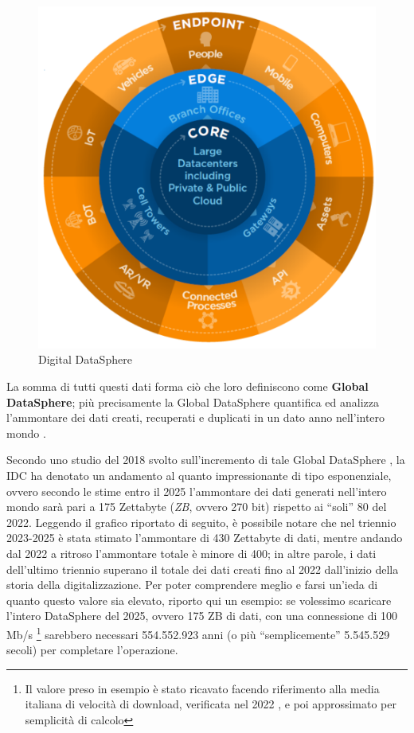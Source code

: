 \begin{figure}[H]
    \centering
    \includegraphics[width=0.5\linewidth]{figure/capitolo_1/Digital-Datasphere.pdf}
    \caption{Digital DataSphere}
    \label{fig:Digital-Datasphere}
\end{figure}

La somma di tutti questi dati forma ciò che loro definiscono come \textbf{Global DataSphere}; più precisamente la Global DataSphere quantifica ed analizza l'ammontare dei dati creati, recuperati e duplicati in un dato anno nell'intero mondo \cite{datadrivendaily_dimension_table}.

Secondo uno studio del 2018 svolto sull'incremento di tale Global DataSphere \cite{idc_global_datasphere}, la IDC ha denotato un andamento al quanto impressionante di tipo esponenziale, ovvero secondo le stime entro il 2025 l'ammontare dei dati generati nell'intero mondo sarà pari a 175 Zettabyte (\textit{ZB}, ovvero 270 bit) rispetto ai “soli” 80 del 2022. Leggendo il grafico riportato di seguito, è possibile notare che nel triennio 2023-2025 è stata stimato l'ammontare di 430 Zettabyte di dati, mentre andando dal 2022 a ritroso l'ammontare totale è minore di 400; in altre parole, i dati dell'ultimo triennio superano il totale dei dati creati fino al 2022 dall'inizio della storia della digitalizzazione. Per poter comprendere meglio e farsi un'ieda di quanto questo valore sia elevato, riporto qui un esempio: se volessimo scaricare l'intero DataSphere del 2025, ovvero 175 ZB di dati, con una connessione di 100 Mb/s \footnote{Il valore preso in esempio è stato ricavato facendo riferimento alla media italiana di velocità di download, verificata nel 2022 \cite{github_speed_connection}, e poi approssimato per semplicità di calcolo} sarebbero necessari 554.552.923 anni (o più “semplicemente” 5.545.529 secoli) per completare l'operazione.

